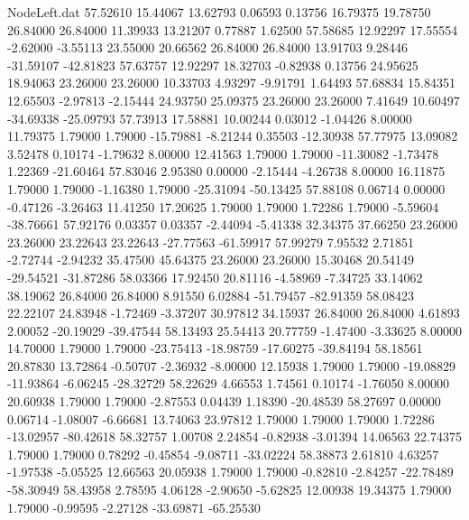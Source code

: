\begin{filecontents}{NodeLeft.dat}
  57.52610   15.44067   13.62793     0.06593    0.13756   16.79375   19.78750   26.84000   26.84000   11.39933   13.21207    0.77887    1.62500
  57.58685   12.92297   17.55554    -2.62000   -3.55113   23.55000   20.66562   26.84000   26.84000   13.91703    9.28446  -31.59107  -42.81823
  57.63757   12.92297   18.32703    -0.82938    0.13756   24.95625   18.94063   23.26000   23.26000   10.33703    4.93297   -9.91791    1.64493
  57.68834   15.84351   12.65503    -2.97813   -2.15444   24.93750   25.09375   23.26000   23.26000    7.41649   10.60497  -34.69338  -25.09793
  57.73913   17.58881   10.00244     0.03012   -1.04426    8.00000   11.79375    1.79000    1.79000  -15.79881   -8.21244    0.35503  -12.30938
  57.77975   13.09082    3.52478     0.10174   -1.79632    8.00000   12.41563    1.79000    1.79000  -11.30082   -1.73478    1.22369  -21.60464
  57.83046    2.95380    0.00000    -2.15444   -4.26738    8.00000   16.11875    1.79000    1.79000   -1.16380    1.79000  -25.31094  -50.13425
  57.88108    0.06714    0.00000    -0.47126   -3.26463   11.41250   17.20625    1.79000    1.79000    1.72286    1.79000   -5.59604  -38.76661
  57.92176    0.03357    0.03357    -2.44094   -5.41338   32.34375   37.66250   23.26000   23.26000   23.22643   23.22643  -27.77563  -61.59917
  57.99279    7.95532    2.71851    -2.72744   -2.94232   35.47500   45.64375   23.26000   23.26000   15.30468   20.54149  -29.54521  -31.87286
  58.03366   17.92450   20.81116    -4.58969   -7.34725   33.14062   38.19062   26.84000   26.84000    8.91550    6.02884  -51.79457  -82.91359
  58.08423   22.22107   24.83948    -1.72469   -3.37207   30.97812   34.15937   26.84000   26.84000    4.61893    2.00052  -20.19029  -39.47544
  58.13493   25.54413   20.77759    -1.47400   -3.33625    8.00000   14.70000    1.79000    1.79000  -23.75413  -18.98759  -17.60275  -39.84194
  58.18561   20.87830   13.72864    -0.50707   -2.36932   -8.00000   12.15938    1.79000    1.79000  -19.08829  -11.93864   -6.06245  -28.32729
  58.22629    4.66553    1.74561     0.10174   -1.76050    8.00000   20.60938    1.79000    1.79000   -2.87553    0.04439    1.18390  -20.48539
  58.27697    0.00000    0.06714    -1.08007   -6.66681   13.74063   23.97812    1.79000    1.79000    1.79000    1.72286  -13.02957  -80.42618
  58.32757    1.00708    2.24854    -0.82938   -3.01394   14.06563   22.74375    1.79000    1.79000    0.78292   -0.45854   -9.08711  -33.02224
  58.38873    2.61810    4.63257    -1.97538   -5.05525   12.66563   20.05938    1.79000    1.79000   -0.82810   -2.84257  -22.78489  -58.30949
  58.43958    2.78595    4.06128    -2.90650   -5.62825   12.00938   19.34375    1.79000    1.79000   -0.99595   -2.27128  -33.69871  -65.25530

\end{filecontents}
